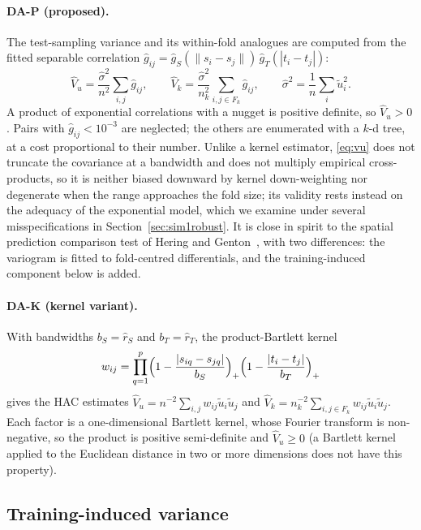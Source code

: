 \paragraph{DA-P (proposed).} The test-sampling variance and its within-fold analogues are computed from the fitted separable correlation $\hat g_{ij}=\hat g_S(\|s_i-s_j\|)\,\hat g_T(|t_i-t_j|)$:
\begin{equation}\label{eq:vu}
\hat V_u=\frac{\hat\sigma^2}{n^2}\sum_{i,j}\hat g_{ij},\qquad
\hat V_k=\frac{\hat\sigma^2}{n_k^2}\sum_{i,j\in F_k}\hat g_{ij},\qquad \hat\sigma^2=\frac1n\sum_i\tilde u_i^2 .
\end{equation}
A product of exponential correlations with a nugget is positive definite, so $\hat V_u>0$. Pairs with $\hat g_{ij}<10^{-3}$ are neglected; the others are enumerated with a $k$-d tree, at a cost proportional to their number. Unlike a kernel estimator, \eqref{eq:vu} does not truncate the covariance at a bandwidth and does not multiply empirical cross-products, so it is neither biased downward by kernel down-weighting nor degenerate when the range approaches the fold size; its validity rests instead on the adequacy of the exponential model, which we examine under several misspecifications in Section~\ref{sec:sim1robust}. It is close in spirit to the spatial prediction comparison test of Hering and Genton~\cite{hering2011}, with two differences: the variogram is fitted to fold-centred differentials, and the training-induced component below is added.

\paragraph{DA-K (kernel variant).} With bandwidths $b_S=\hat r_S$ and $b_T=\hat r_T$, the product-Bartlett kernel
\begin{equation}\label{eq:kernel}
w_{ij}=\prod_{q=1}^{p}\Bigl(1-\frac{|s_{iq}-s_{jq}|}{b_S}\Bigr)_+\Bigl(1-\frac{|t_i-t_j|}{b_T}\Bigr)_+
\end{equation}
gives the HAC estimates $\hat V_u=n^{-2}\sum_{i,j}w_{ij}\tilde u_i\tilde u_j$ and $\hat V_k=n_k^{-2}\sum_{i,j\in F_k}w_{ij}\tilde u_i\tilde u_j$. Each factor is a one-dimensional Bartlett kernel, whose Fourier transform is non-negative, so the product is positive semi-definite and $\hat V_u\ge0$ (a Bartlett kernel applied to the Euclidean distance in two or more dimensions does not have this property).

\subsection{Training-induced variance}

